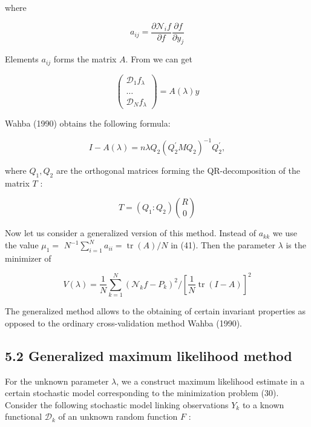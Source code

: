 \documentclass[10pt]{article}
\begin{document}
where


\begin{equation*}
a_{i j}=\frac{\partial \mathcal{N}_{i} f}{\partial f} \frac{\partial f}{\partial y_{j}} \tag{42}
\end{equation*}


Elements $a_{i j}$ forms the matrix $A$. From we can get

$$
\left(\begin{array}{r}
\mathcal{D}_{1} f_{\lambda} \\
\\
\ldots \\
\mathcal{D}_{N} f_{\lambda}
\end{array}\right)=A(\lambda) y
$$

Wahba (1990) obtains the following formula:


\begin{equation*}
I-A(\lambda)=n \lambda Q_{2}\left(Q_{2}^{\prime} M Q_{2}\right)^{-1} Q_{2}^{\prime}, \tag{43}
\end{equation*}


where $Q_{1}, Q_{2}$ are the orthogonal matrices forming the QR-decomposition of the matrix $T$ :


\begin{equation*}
T=\left(Q_{1}: Q_{2}\right)\binom{R}{0} \tag{44}
\end{equation*}


Now let us consider a generalized version of this method. Instead of $a_{k k}$ we use the value $\mu_{1}=$ $N^{-1} \sum_{i=1}^{N} a_{i i}=\operatorname{tr}(A) / N$ in (41). Then the parameter $\lambda$ is the minimizer of


\begin{equation*}
V(\lambda)=\frac{1}{N} \sum_{k=1}^{N}\left(\mathcal{N}_{k} f-P_{k}\right)^{2} /\left[\frac{1}{N} \operatorname{tr}(I-A)\right]^{2} \tag{45}
\end{equation*}


The generalized method allows to the obtaining of certain invariant properties as opposed to the ordinary cross-validation method Wahba (1990).

\subsection*{5.2 Generalized maximum likelihood method}
For the unknown parameter $\lambda$, we a construct maximum likelihood estimate in a certain stochastic model corresponding to the minimization problem (30). Consider the following stochastic model linking observations $Y_{k}$ to a known functional $\mathcal{D}_{k}$ of an unknown random function $F$ :
\end{document}
